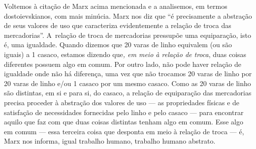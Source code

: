 Voltemos à citação de Marx acima mencionada e a analisemos, em termos
dostoievskianos, com mais minúcia. Marx nos diz que ``é precisamente a
abstração de seus valores de uso que caracteriza evidentemente a relação
de troca das mercadorias''. A~relação de troca de mercadorias pressupõe
uma equiparação, isto é, uma igualdade. Quando dizemos que 20 varas de
linho equivalem (ou são iguais) a 1 casaco, estamos dizendo que\emph{,
em meio à relação de troca}, duas coisas diferentes possuem algo em
comum. Por outro lado, não pode haver relação de igualdade onde não há
diferença, uma vez que não trocamos 20 varas de linho por 20 varas de
linho e/ou 1 casaco por um mesmo casaco. Como as 20 varas de linho são
distintas, em si e para si, do casaco, a relação de equiparação das
mercadorias precisa proceder à abstração dos valores de uso --- as
propriedades físicas e de satisfação de necessidades fornecidas pelo
linho e pelo casaco --- para encontrar aquilo que faz com que duas coisas
distintas tenham algo em comum. Esse algo em comum --- essa terceira
coisa que desponta em meio à relação de troca --- é, Marx nos informa,
igual trabalho humano, trabalho humano abstrato.

